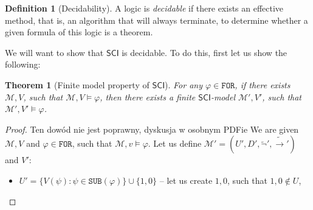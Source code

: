 \documentclass{article}
\newtheorem{theorem}{Theorem}
\theoremstyle{definition}
\newtheorem{definition}{Definition}[section]
\theoremstyle{definition}
\theoremstyle{definition}
\newcommand*{\ra}{\rightarrow}
\newcommand*{\FOR}{\texttt{FOR}}
\newcommand*{\SUB}{\texttt{SUB}}
\newcommand{\SCI}{$\mathsf{SCI}$\xspace}
\begin{document}
\begin{definition}[Decidability]
    A logic is \emph{decidable} if there exists an effective method, that is, an algorithm that will always terminate, to determine whether a given formula of this logic is a theorem.
\end{definition}
%
We will want to show that \SCI is decidable. To do this, first let us show the
following:
\begin{theorem}[Finite model property of \SCI]
    \label{finite_model}
    For any $\varphi \in \FOR$, if there exists $\mathcal{M},V$, such that $\mathcal{M},V \models \varphi$, then there exists a finite \SCI-model $\mathcal{M'},V'$, such that $\mathcal{M'},V'\models \varphi$.
\end{theorem}
\begin{proof}
    {\color{red} Ten dowód nie jest poprawny, dyskusja w osobnym PDFie}
    We are given $\mathcal{M}, V$ and $\varphi \in \FOR$, such that $\mathcal{M}, v \models \varphi$. Let us define $\mathcal{M'} = (U', D', \tilde{\lnot}', \tilde{\ra}')$ and $V'$:
    \begin{itemize}
        \item $U' = \{V(\psi) : \psi \in \SUB(\varphi)\} \cup \{1, 0\}$ -- let us create $1, 0$, such that $1, 0 \not \in U$,


\end{itemize}
\end{proof}
\end{document}
